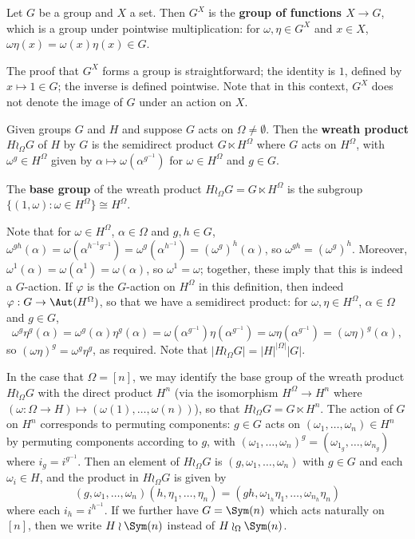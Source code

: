 \begin{definition}\label{def:function_group}
    Let $G$ be a group and $X$ a set. Then $G^X$ is the \textbf{group of functions $X \to G$}, which is a group under pointwise multiplication: for $\omega,\eta \in G^X$ and $x \in X$, $\omega\eta(x) = \omega(x)\eta(x) \in G$.
\end{definition}

The proof that $G^X$ forms a group is straightforward; the identity is $1$, defined by $x \mapsto 1 \in G$; the inverse is defined pointwise. Note that in this context, $G^X$ does not denote the image of $G$ under an action on $X$.

\begin{definition}\label{def:wreath_product}
    Given groups $G$ and $H$ and suppose $G$ acts on $\Omega \neq \emptyset$. Then the \textbf{wreath product} $H \wr_\Omega G$ of $H$ by $G$ is the semidirect product $G \ltimes H^\Omega$ where $G$ acts on $H^\Omega$, with $\omega^g \in H^\Omega$ given by $\alpha \mapsto \omega(\alpha^{g^{-1}})$ for $\omega \in H^\Omega$ and $g \in G$.

    The \textbf{base group} of the wreath product $H \wr_\Omega G = G \ltimes H^\Omega$ is the subgroup $\{(1,\omega) : \omega \in H^\Omega\} \cong H^\Omega$.
\end{definition}

Note that for $\omega \in H^\Omega$, $\alpha \in \Omega$ and $g,h \in G$, $\omega^{gh}(\alpha) = \omega(\alpha^{h^{-1}g^{-1}}) = \omega^g(\alpha^{h^{-1}}) = (\omega^g)^h(\alpha)$, so $\omega^{gh} = (\omega^g)^h$. Moreover, $\omega^1(\alpha) = \omega(\alpha^1) = \omega(\alpha)$, so $\omega^1 = \omega$; together, these imply that this is indeed a $G$-action. If $\varphi$ is the $G$-action on $H^\Omega$ in this definition, then indeed $\varphi : G \to \Aut(H^\Omega)$, so that we have a semidirect product: for $\omega,\eta \in H^\Omega$, $\alpha \in \Omega$ and $g \in G$,
$$\omega^g\eta^g(\alpha) = \omega^g(\alpha)\eta^g(\alpha) = \omega(\alpha^{g^{-1}})\eta(\alpha^{g^{-1}}) = \omega\eta(\alpha^{g^{-1}}) = (\omega\eta)^g(\alpha),$$
so $(\omega\eta)^g = \omega^g\eta^g$, as required. Note that $|H \wr_\Omega G| = |H|^{|\Omega|} |G|$.

In the case that $\Omega = [n]$, we may identify the base group of the wreath product $H \wr_\Omega G$ with the direct product $H^n$ (via the isomorphism $H^{\Omega} \to H^n$ where $(\omega : \Omega \to H) \mapsto (\omega(1),\dotsc,\omega(n))$), so that $H \wr_\Omega G = G \ltimes H^n$. The action of $G$ on $H^n$ corresponds to permuting components: $g \in G$ acts on $(\omega_1,\dotsc,\omega_n) \in H^n$ by permuting components according to $g$, with $(\omega_1,\dotsc,\omega_n)^g = (\omega_{1_g},\dotsc,\omega_{n_g})$ where $i_g = i^{g^{-1}}$. Then an element of $H \wr_\Omega G$ is $(g,\omega_1,\dotsc,\omega_n)$ with $g \in G$ and each $\omega_i \in H$, and the product in $H \wr_\Omega G$ is given by
$$(g,\omega_1,\dotsc,\omega_n)(h,\eta_1,\dotsc,\eta_n) = (gh,\omega_{1_h}\eta_1,\dotsc,\omega_{n_h}\eta_n)$$
where each $i_h = i^{h^{-1}}$. If we further have $G = \Sym(n)$ which acts naturally on $[n]$, then we write $H \wr \Sym(n)$ instead of $H \wr_\Omega \Sym(n)$.

